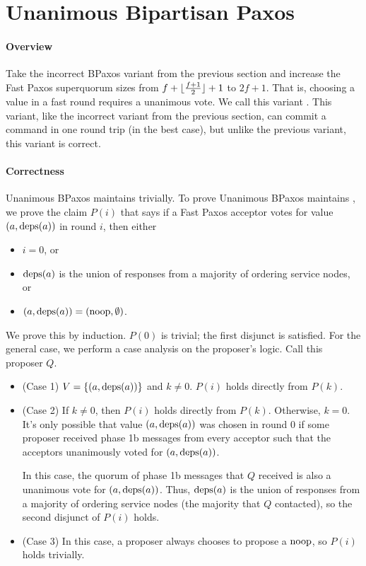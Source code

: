 \section{Unanimous Bipartisan Paxos}
\paragraph{Overview}
Take the incorrect BPaxos variant from the previous section and increase the
Fast Paxos superquorum sizes from $f + \lfloor\frac{f+1}{2}\rfloor + 1$ to $2f + 1$.
That is, choosing a value in a fast round requires a unanimous vote. We call
this variant . This variant, like the incorrect
variant from the previous section, can commit a command in one round trip (in
the best case), but unlike the previous variant, this variant is correct.

\paragraph{Correctness}
Unanimous BPaxos maintains  trivially. To prove Unanimous
BPaxos maintains , we prove the claim $P(i)$ that
says if a Fast Paxos acceptor votes for value $(a, \text{deps}(a))$ in round $i$,
then either
\begin{itemize}
  \item
    $i = 0$, or
  \item
    $\text{deps}(a)$ is the union of responses from a majority of ordering service
    nodes, or
  \item
    $(a, \text{deps}(a)) = (\text{noop}, \emptyset)$.
\end{itemize}
We prove this by induction. $P(0)$ is trivial; the first disjunct is satisfied.
For the general case, we perform a case analysis on the proposer's logic. Call
this proposer $Q$.
\begin{itemize}
  \item (Case 1)
    $V = \{(a, \text{deps}(a))\}$ and $k \neq 0$. $P(i)$ holds directly from
    $P(k)$.

  \item (Case 2)
    If $k \neq 0$, then $P(i)$ holds directly from $P(k)$. Otherwise, $k = 0$.
    It's only possible that value $(a, \text{deps}(a))$ was chosen in round $0$ if
    some proposer received phase 1b messages from every acceptor such that the
    acceptors unanimously voted for $(a, \text{deps}(a))$.

    In this case, the quorum of phase 1b messages that $Q$ received is also a
    unanimous vote for $(a, \text{deps}(a))$.  Thus, $\text{deps}(a)$ is the union of
    responses from a majority of ordering service nodes (the majority that $Q$
    contacted), so the second disjunct of $P(i)$ holds.

  \item (Case 3)
    In this case, a proposer always chooses to propose a $\text{noop}$, so $P(i)$
    holds trivially.
\end{itemize}


